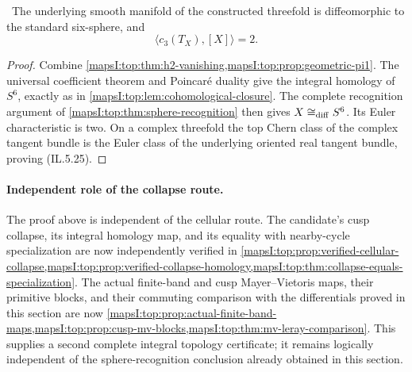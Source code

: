 \begin{corollary}
\label{mapsI:top:cor:candidate-sphere}
\ The underlying smooth manifold of the constructed threefold is
diffeomorphic to the standard six-sphere, and
\[
 \langle c_3(T_X),[X]\rangle=2.
\tag{IL.5.25}
\]
\end{corollary}

\begin{proof}
Combine \cref{mapsI:top:thm:h2-vanishing,mapsI:top:prop:geometric-pi1}.  The universal
coefficient theorem and Poincar\'e duality give the integral homology of
\(S^6\), exactly as in \cref{mapsI:top:lem:cohomological-closure}.  The complete
recognition argument of \cref{mapsI:top:thm:sphere-recognition} then gives
\(X\cong_{\rm diff}S^6\).  Its Euler characteristic is two.  On a complex
threefold the top Chern class of the complex tangent bundle is the Euler
class of the underlying oriented real tangent bundle, proving (IL.5.25).
\end{proof}

\paragraph{Independent role of the collapse route.}
The proof above is independent of the cellular route.  The candidate's cusp
collapse, its integral homology map, and its equality with nearby-cycle
specialization are now independently verified in
\cref{mapsI:top:prop:verified-cellular-collapse,mapsI:top:prop:verified-collapse-homology,mapsI:top:thm:collapse-equals-specialization}.  The actual finite-band and cusp
Mayer--Vietoris maps, their primitive blocks, and their commuting comparison
with the differentials proved in this section are now
\cref{mapsI:top:prop:actual-finite-band-maps,mapsI:top:prop:cusp-mv-blocks,mapsI:top:thm:mv-leray-comparison}.  This supplies a second complete integral topology
certificate; it remains logically independent of the sphere-recognition
conclusion already obtained in this section.

